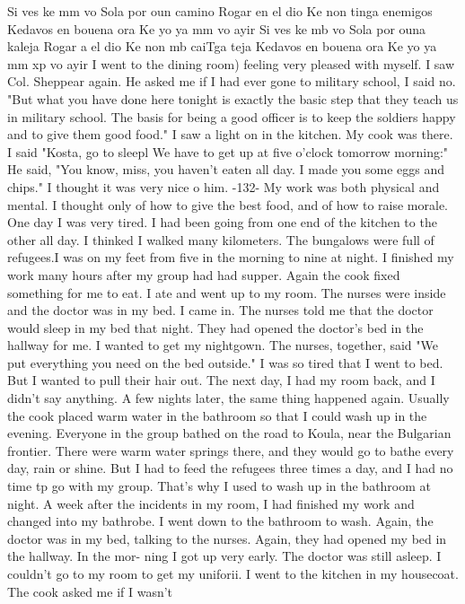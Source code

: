Si ves ke mm vo 
Sola por oun camino 
Rogar en el dio 
Ke non tinga enemigos 
Kedavos en bouena ora 
Ke yo ya mm vo ayir 
Si ves ke mb vo 
Sola por ouna kaleja 
Rogar a el dio 
Ke non mb caiTga teja 
Kedavos en bouena ora 
Ke yo ya mm xp vo ayir 
I went to the dining room) feeling very pleased with myself. I saw Col. Sheppear 
again. He asked me if I had ever gone to military school, I said no. "But what you 
have done here tonight is exactly the basic step that they teach us in military 
school. The basis for being a good officer is to keep the soldiers happy and to give 
them good food." 
I saw a light on in the kitchen. My cook was there. I said "Kosta, go to sleepl 
We have to get up at five o'clock tomorrow morning:" He said, "You know, miss, you 
haven't eaten all day. I made you some eggs and chips." I thought it was very nice o 
him. 
-132- 
My work was both physical and mental. I thought only of how to give the best 
food, and of how to raise morale. One day I was very tired. I had been going from 
one end of the kitchen to the other all day. I thinked I walked many kilometers. 
The bungalows were full of refugees.I was on my feet from five in the morning to 
nine at night. I finished my work many hours after my group had had supper. Again 
the cook fixed something for me to eat. I ate and went up to my room. The nurses 
were inside and the doctor was in my bed. I came in. The nurses told me that the 
doctor would sleep in my bed that night. They had opened the doctor's bed in the 
hallway for me. 
I wanted to get my nightgown. The nurses, together, said "We put everything you 
need on the bed outside." I was so tired that I went to bed. But I wanted to pull 
their hair out. The next day, I had my room back, and I didn't say anything. A few 
nights later, the same thing happened again. 
Usually the cook placed warm water in the bathroom so that I could wash up in 
the evening. Everyone in the group bathed on the road to Koula, near the Bulgarian 
frontier. There were warm water springs there, and they would go to bathe every day, 
rain or shine. But I had to feed the refugees three times a day, and I had no time 
tp go with my group. That's why I used to wash up in the bathroom at night. 
A week after the incidents in my room, I had finished my work and changed into 
my bathrobe. I went down to the bathroom to wash. Again, the doctor was in my bed, 
talking to the nurses. Again, they had opened my bed in the hallway. In the mor-
ning I got up very early. The doctor was still asleep. I couldn't go to my room to 
get my uniforii. I went to the kitchen in my housecoat. The cook asked me if I wasn't 
